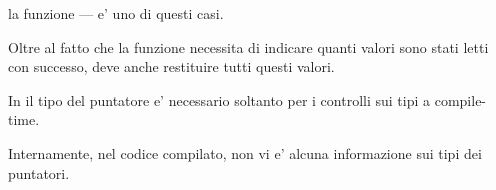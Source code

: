 la funzione  --- e' uno di questi casi.

Oltre al fatto che la funzione necessita di indicare quanti valori sono stati letti con successo, deve anche restituire tutti questi valori.

In \CCpp il tipo del puntatore e' necessario soltanto per i controlli sui tipi a compile-time.

Internamente, nel codice compilato, non vi e' alcuna informazione sui tipi dei puntatori.





